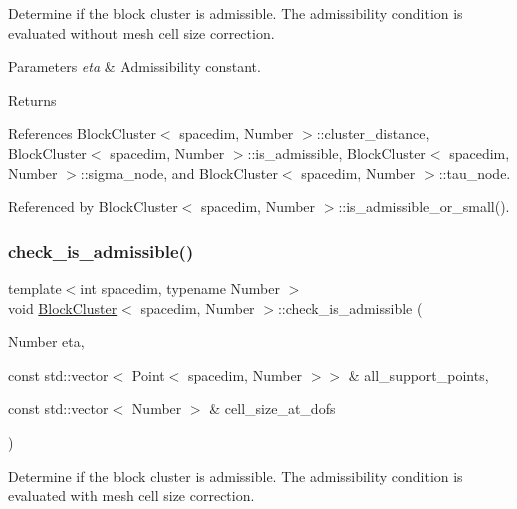Determine if the block cluster is admissible. The admissibility condition is evaluated without mesh cell size correction.


\begin{DoxyParams}{Parameters}
{\em eta} & Admissibility constant. \\
\hline
\end{DoxyParams}
\begin{DoxyReturn}{Returns}

\end{DoxyReturn}


References Block\+Cluster$<$ spacedim, Number $>$\+::cluster\+\_\+distance, Block\+Cluster$<$ spacedim, Number $>$\+::is\+\_\+admissible, Block\+Cluster$<$ spacedim, Number $>$\+::sigma\+\_\+node, and Block\+Cluster$<$ spacedim, Number $>$\+::tau\+\_\+node.



Referenced by Block\+Cluster$<$ spacedim, Number $>$\+::is\+\_\+admissible\+\_\+or\+\_\+small().

\mbox{\label{classBlockCluster_a79e83ccbdb52032b6b2d83e7d095e62d}} 
\subsubsection{\texorpdfstring{check\+\_\+is\+\_\+admissible()}{check\_is\_admissible()}\hspace{0.1cm}{\footnotesize\ttfamily [2/2]}}
{\footnotesize\ttfamily template$<$int spacedim, typename Number $>$ \\
void \hyperlink{classBlockCluster}{Block\+Cluster}$<$ spacedim, Number $>$\+::check\+\_\+is\+\_\+admissible (\begin{DoxyParamCaption}\item[{Number}]{eta,  }\item[{const std\+::vector$<$ Point$<$ spacedim, Number $>$$>$ \&}]{all\+\_\+support\+\_\+points,  }\item[{const std\+::vector$<$ Number $>$ \&}]{cell\+\_\+size\+\_\+at\+\_\+dofs }\end{DoxyParamCaption})}

Determine if the block cluster is admissible. The admissibility condition is evaluated with mesh cell size correction.


